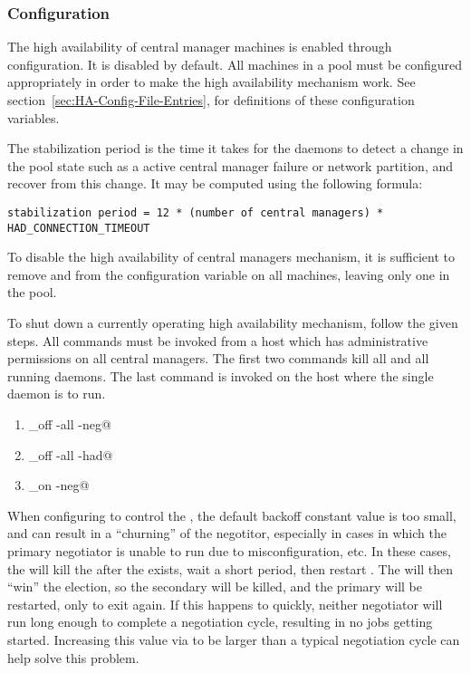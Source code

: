 \subsubsection{\label{sec:HA-configuration} Configuration} 

The high availability of central manager machines is
enabled through configuration.
It is disabled by default.
All machines in a pool must be configured appropriately
in order to make the high availability mechanism work.
See
section~\ref{sec:HA-Config-File-Entries},
for definitions of these configuration variables.

The stabilization period is the time it takes for the 
 daemons
to detect a change in the pool state such as
a active central manager failure
or network partition, and recover from this change.
It may be computed using the following formula:
\footnotesize
\begin{verbatim}
stabilization period = 12 * (number of central managers) * HAD_CONNECTION_TIMEOUT
\end{verbatim}
\normalsize


To disable the high availability of central managers mechanism,
it is sufficient to remove
 and  from the
 configuration variable on all machines,
leaving only one  in the pool. 

To shut down a currently operating high availability mechanism,
follow the given steps.
All commands must be invoked
from a host which has administrative permissions
on all central managers.
The first two commands kill all 
and all running  daemons.
The last command is invoked on the host where the
single  daemon is to run.

\begin{enumerate}
\item \verb@condor_off -all -neg@
\item \verb@condor_off -all -had@
\item \verb@condor_on -neg@
\end{enumerate}

When configuring  to control the ,
the default backoff constant value is too small, and can result in
a ``churning'' of the negotitor, especially in cases in which the
primary negotiator is unable to run due to misconfiguration, etc.
In these cases, the  will kill the  after
the  exists, wait a short period, then restart
.  The  will then ``win'' the election, so
the secondary  will be killed, and the primary
will be restarted, only to exit again.  If this happens to quickly,
neither negotiator will run long enough to complete a negotiation
cycle, resulting in no jobs getting started.  Increasing this value
via 
to be larger than a typical negotiation cycle can help solve this
problem.

